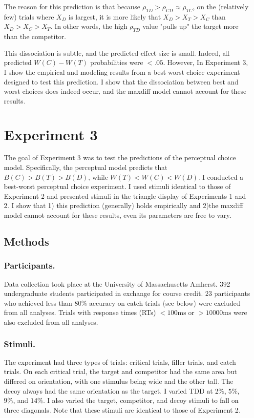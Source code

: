{{{{The reason for this prediction is that because $\rho_{TD}>\rho_{CD}\approx\rho_{TC}$, on the (relatively few) trials where $X_{D}$ is largest, it is more likely that $X_{D}>X_{T}>X_{C}$ than $X_{D}>X_{C}>X_{T}$. In other words, the high $\rho_{TD}$ value "pulls up" the target more than the competitor.

This dissociation is subtle, and the predicted effect size is small. Indeed, all predicted $W(C)-W(T)$ probabilities were $<.05$. However, In Experiment 3, I show the empirical and modeling results from a best-worst choice experiment designed to test this prediction. I show that the dissociation between best and worst choices does indeed occur, and the maxdiff model cannot account for these results.

\section{Experiment 3}

The goal of Experiment 3 was to test the predictions of the perceptual choice model. Specifically, the perceptual model predicts that $B(C)>B(T)>B(D)$, while $W(T)<W(C)<W(D)$. I conducted a best-worst perceptual choice experiment. I used stimuli identical to those of Experiment 2 and presented stimuli in the triangle display of Experiments 1 and 2.
I show that 1) this prediction (generally) holds empirically and 2)the maxdiff model cannot account for these results, even its parameters are free to vary. 

\subsection{Methods}

\subsubsection{Participants.}
Data collection took place at the University of Massachusetts Amherst. 392 undergraduate students participated in exchange for course credit. 23 participants who achieved less than $80\%$ accuracy on catch trials (see below) were excluded from all analyses. Trials with response times (RTs) $<100\text{ms}$ or  $>10000\text{ms}$ were also excluded from all analyses.

\subsubsection{Stimuli.}
The experiment had three types of trials: critical trials, filler trials, and catch trials. 
On each critical trial, the target and competitor had the same area but differed on orientation, with one stimulus being wide and the other tall. The decoy always had the same orientation as the target. I varied TDD at $2\%$, $5\%$, $9\%$, and $14\%$. I also varied the target, competitor, and decoy stimuli to fall on three diagonals. Note that these stimuli are identical to those of Experiment 2.

}}}}

